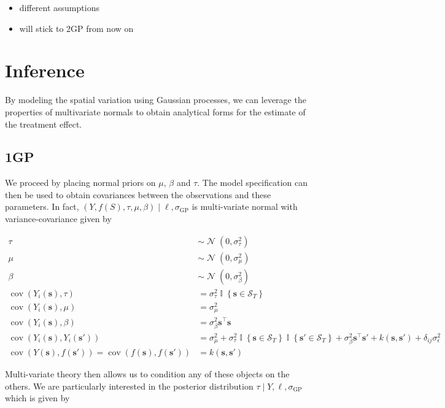\documentclass[letter]{article}
\providecommand{\tightlist}{%
      \setlength{\itemsep}{0pt}\setlength{\parskip}{0pt}}
\newcommand{\genericdel}[3]{%
      \left#1#3\right#2
    }
\newcommand{\del}[1]{\genericdel(){#1}}
\newcommand{\cbr}[1]{\genericdel\{\}{#1}}
\DeclareMathOperator{\cov}{{cov}}
\DeclareMathOperator{\Ind}{\mathbb{I}}
\DeclareMathOperator{\normal}{\mathcal{N}}
\newcommand{\trans}{^{\intercal}}
\newcommand{\scrS}{\mathscr{S}}
\newcommand{\sigmaf}{\sigma_{\mathrm{GP}}}
\newcommand{\sigman}{\sigma_{\epsilon}}
\newcommand{\sigmatau}{\sigma_{\tau}}
\newcommand{\sigmabeta}{\sigma_{\beta}}
\newcommand{\sigmamu}{\sigma_{\mu}}
\newcommand{\svec}{\mathbold{s}}
\providecommand{\tightlist}{%
  	  \setlength{\itemsep}{0pt}\setlength{\parskip}{0pt}}
\begin{document}
\begin{itemize}
\tightlist
\item
  different assumptions
\item
  will stick to 2GP from now on
\end{itemize}
    


    	\section{Inference}\label{inference}

By modeling the spatial variation using Gaussian processes, we can
leverage the properties of multivariate normals to obtain analytical
forms for the estimate of the treatment effect.
    


    	\subsection{1GP}\label{gp}

We proceed by placing normal priors on \(\mu\), \(\beta\) and \(\tau\).
The model specification can then be used to obtain covariances between
the observations and these parameters. In fact,
\(\del{Y,f(S),\tau,\mu,\beta} \mid \ell,\sigmaf\) is multi-variate
normal with variance-covariance given by

\begin{equation}
\begin{split}
    \tau  &\sim \normal\del{0,\sigmatau^2} \\
    \mu   &\sim \normal\del{0,\sigmamu^2} \\
    \beta &\sim \normal\del{0,\sigmabeta^2} \\
    \cov(Y_i(\svec),\tau) &= \sigmatau^2 \Ind\cbr{\svec \in \scrS_T} \\
    \cov(Y_i(\svec),\mu)  &= \sigmamu^2 \\
    \cov(Y_i(\svec),\beta)&= \sigmabeta^2 \svec\trans \svec \\
    \cov(Y_i(\svec),Y_i(\svec'))&= \sigmamu^2 + \sigmatau^2 \Ind\cbr{\svec \in \scrS_T}\Ind\cbr{\svec' \in \scrS_T} + \sigmabeta^2 \svec\trans \svec' + k(\svec,\svec') + \delta_{ij}\sigman^2\\
    \cov(Y(\svec),f(\svec')) = \cov(f(\svec),f(\svec')) &= k(\svec,\svec')
\end{split}
\end{equation}

Multi-variate theory then allows us to condition any of these objects on
the others. We are particularly interested in the posterior distribution
\(\tau \mid Y, \ell, \sigmaf\) which is given by
\end{document}
